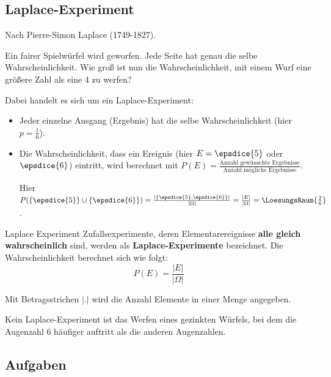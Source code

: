 
\subsection{Laplace-Experiment}
Nach Pierre-Simon Laplace (1749-1827).

Ein fairer Spielwürfel wird geworfen. Jede Seite hat genau die selbe
Wahrscheinlichkeit. Wie groß ist nun die Wahrscheinlichkeit, mit einem
Wurf eine größere Zahl als eine 4 zu werfen?


Dabei handelt es sich um ein Laplace-Experiment:
\begin{itemize}
\item Jeder einzelne Ausgang (Ergebnis) hat die selbe Wahrscheinlichkeit
      (hier $p = \frac{1}{6}$).
\item Die Wahrscheinlichkeit, dass ein Ereignis (hier $E = \epsdice{5}$
oder $\epsdice{6}$) eintritt, wird berechnet mit $P(E)
= \frac{\text{Anzahl gewünschte Ergebnisse}}{\text{Anzahl
mögliche Ergebnisse}}$.

Hier $P(\{\epsdice{5}\}\cup\{\epsdice{6}\}) = \frac{\left|\left\{\epsdice{5}, \epsdice{6}\right\}\right|}{|\Omega|}= \frac{|E|}{|\Omega|}=\LoesungsRaum{\frac{2}{6}}$.
\end{itemize}

\begin{definition}{Laplace Experiment}{}
  Zufallsexperimente, deren Elementarereignisse \textbf{alle gleich wahrscheinlich} sind, werden als
  \textbf{Laplace-Experimente} bezeichnet. Die Wahrscheinlichkeit berechnet sich wie folgt:
  $$P(E) = \frac{|E|}{|\Omega|}$$
\end{definition}

\begin{definition}{}{}
Mit Betragsstrichen $|.|$ wird die Anzahl Elemente in einer Menge angegeben.
\end{definition}


Kein Laplace-Experiment ist \zB das Werfen eines gezinkten Würfels,
bei dem die Augenzahl 6 häufiger auftritt als die anderen Augenzahlen.
\newpage
\subsection*{Aufgaben}

\newpage
